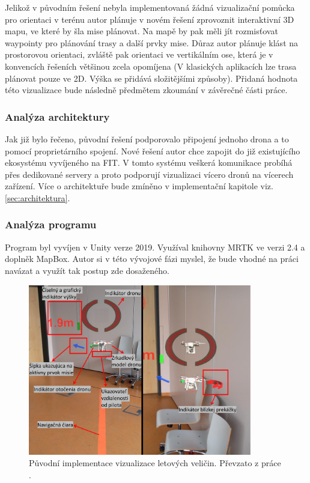 Jelikož v původním řešení nebyla implementovaná žádná vizualizační pomůcka pro orientaci v terénu autor plánuje v novém řešení zprovoznit interaktivní 3D mapu, ve které by šla mise plánovat. Na mapě by pak měli jít rozmisťovat waypointy pro plánování trasy a další prvky mise. Důraz autor plánuje klást na prostorovou orientaci, zvláště pak orientaci ve vertikálním ose, která je v konvencích řešeních většinou zcela opomíjena (V klasických aplikacích lze trasa plánovat pouze ve 2D. Výška se přidává složitějšími způsoby). Přidaná hodnota této vizualizace bude následně předmětem zkoumání v závěrečné části práce.
\subsubsection{Analýza architektury}
Jak již bylo řečeno, původní řešení podporovalo připojení jednoho drona a to pomocí proprietárního spojení. Nové řešení autor chce zapojit do již existujícího ekosystému vyvíjeného na FIT. V tomto systému veškerá komunikace probíhá přes dedikované servery a proto podporují vizualizaci vícero dronů na vícerech zařízení. Více o architektuře bude zmíněno v implementační kapitole viz. \ref{sec:architektura}.
\subsubsection{Analýza programu}
Program byl vyvíjen v Unity verze 2019. Využíval knihovny MRTK ve verzi 2.4 a doplněk MapBox. Autor si v této vývojové fázi myslel, že bude vhodné na práci navázat a využít tak postup zde dosaženého.

\begin{figure}[H]
	\centering
	\includegraphics[width=0.87\textwidth]{obrazky-figures/navrh/prevUiDesign.pdf}
	\caption{Původní implementace vizualizace letových veličin. Převzato z práce \cite{KyjacMartin2022Vnpp}.}
	\label{pic:prevUiDesign}
\end{figure}


